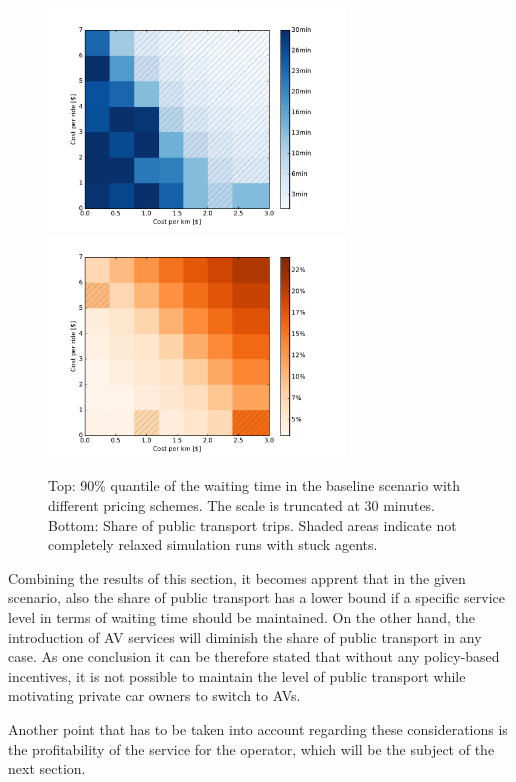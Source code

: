 \begin{figure}
    \centering
    \includegraphics[width=0.7\textwidth]{figures/waitingtimegrid.pdf}
    \includegraphics[width=0.7\textwidth]{figures/ptsharegrid.pdf}
    \caption{Top: 90\% quantile of the waiting time in the baseline scenario with different
    pricing schemes. The scale is truncated at 30 minutes. Bottom: Share of public transport
    trips. Shaded areas indicate not completely relaxed simulation runs with stuck agents.}
    \label{fig:moregrids}
\end{figure}

Combining the results of this section, it becomes apprent that in the given scenario,
also the share of public transport has a lower bound if a specific service level in
terms of waiting time should be maintained. On the other hand, the introduction of
AV services will diminish the share of public transport in any case. As one conclusion
it can be therefore stated that without any policy-based incentives, it is not possible
to maintain the level of public transport while motivating private car owners to switch to AVs.

Another point that has to be taken into account regarding these considerations is
the profitability of the service for the operator, which will be the subject of the
next section.

